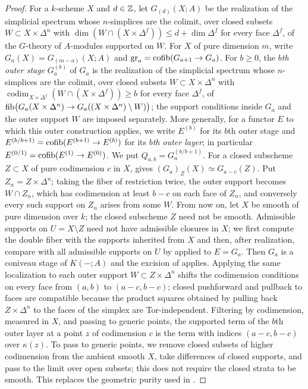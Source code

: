 \begin{proof}
For a $k$-scheme $X$ and $d\in\mathbb Z$, let $G_{(d)}(X;A)$ be the realization of the simplicial spectrum whose $n$-simplices are the colimit, over closed subsets $W\subset X\times\Delta^n$ with $\dim(W\cap(X\times\Delta^f))\le d+\dim\Delta^f$ for every face $\Delta^f$, of the $G$-theory of $A$-modules supported on $W$.
For $X$ of pure dimension $m$, write $G_a(X)=G_{(m-a)}(X;A)$ and $\mathrm{gr}_a=\operatorname{cofib}(G_{a+1}\to G_a)$.
For $b\ge0$, the \emph{$b$th outer stage} $G_a^{(b)}$ of $G_a$ is the realization of the simplicial spectrum whose $n$-simplices are the colimit, over closed subsets $W\subset X\times\Delta^n$ with $\operatorname{codim}_{X\times\Delta^f}(W\cap(X\times\Delta^f))\ge b$ for every face $\Delta^f$, of $\operatorname{fib}\bigl(G_a(X\times\Delta^n)\to G_a((X\times\Delta^n)\setminus W)\bigr)$; the support conditions inside $G_a$ and the outer support $W$ are imposed separately.
More generally, for a functor $E$ to which this outer construction applies, we write $E^{(b)}$ for its $b$th outer stage and $E^{(b/b+1)}=\operatorname{cofib}(E^{(b+1)}\to E^{(b)})$ for its \emph{$b$th outer layer}; in particular $E^{(0/1)}=\operatorname{cofib}(E^{(1)}\to E^{(0)})$.
We put $Q_{a,b}=G_a^{(b/b+1)}$.
For a closed subscheme $Z\subset X$ of pure codimension $c$ in $X$, \cite[Corollary 6.3.3]{KahnLevine2010} gives $(G_a)_Z(X)\simeq G_{a-c}(Z)$.
Put $Z_n=Z\times\Delta^n$; taking the fiber of restriction twice, the outer support becomes $W\cap Z_n$, which has codimension at least $b-c$ on each face of $Z_n$, and conversely every such support on $Z_n$ arises from some $W$.
From now on, let $X$ be smooth of pure dimension over $k$; the closed subscheme $Z$ need not be smooth.
Admissible supports on $U=X\setminus Z$ need not have admissible closures in $X$; we first compute the double fiber with the supports inherited from $X$ and then, after realization, compare with all admissible supports on $U$ by \cite[Corollary 3.2.2]{LevineHomotopyConiveau} applied to $E=G_a$.
Then $G_a$ is a coniveau stage of $K(-;A)$ and the excision of \cite[Theorem 4.1.1]{LevineHomotopyConiveau} applies.
Applying the same localization to each outer support $W\subset Z\times\Delta^n$ shifts the codimension conditions on every face from $(a,b)$ to $(a-c,b-c)$; closed pushforward and pullback to faces are compatible because the product squares obtained by pulling back $Z\times\Delta^n$ to the faces of the simplex are Tor-independent.
Filtering by codimension, measured in $X$, and passing to generic points, the supported term of the $b$th outer layer at a point $z$ of codimension $c$ is the term with indices $(a-c,b-c)$ over $\kappa(z)$.
To pass to generic points, we remove closed subsets of higher codimension from the ambient smooth $X$, take differences of closed supports, and pass to the limit over open subsets; this does not require the closed strata to be smooth.
This replaces the geometric purity used in \cite[Corollaries 4.2.3--4.2.4]{LevineHomotopyConiveau}.


\end{proof}
